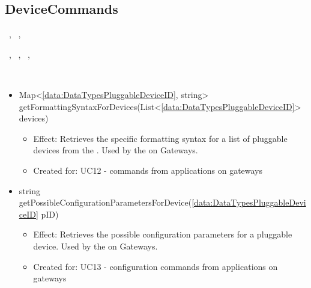   \subsection{DeviceCommands}\label{int:GatewayGatewayDeviceManagerDeviceCommands}
    \begin{description}
      \item[Provided by:] \iconcomponent{}~, \iconcomponent{}~, \iconcomponent{}~
      \item[Required by:] \iconcomponent{}~, \iconcomponent{}~, \iconcomponent{}~, \iconcomponent{}~
      \item[Operations:] ~
    \begin{itemize}[noitemsep,nolistsep,leftmargin=-.25cm]
      \item \textsf{Map\textless{}\ref{data:DataTypesPluggableDeviceID}, string\textgreater{} getFormattingSyntaxForDevices(List\textless{}\ref{data:DataTypesPluggableDeviceID}\textgreater{} devices)}
        \begin{itemize}[noitemsep,nolistsep]
           \item Effect: Retrieves the specific formatting syntax for a list of pluggable devices from the . Used by the  on Gateways.
\item Created for: UC12 - commands from applications on gateways
        \end{itemize}
      \item \textsf{string getPossibleConfigurationParametersForDevice(\ref{data:DataTypesPluggableDeviceID} pID)}
        \begin{itemize}[noitemsep,nolistsep]
           \item Effect: Retrieves the possible configuration parameters for a pluggable device. Used by the  on Gateways.
\item Created for: UC13 - configuration commands from applications on gateways

\end{itemize}
\end{itemize}
\end{description}
